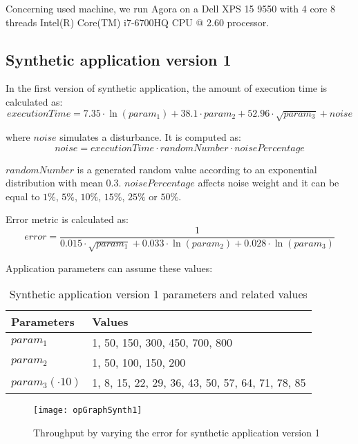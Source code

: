 Concerning used machine, we run Agora on a Dell XPS 15 9550 with 4 core 8 threads Intel(R) Core(TM) i7-6700HQ CPU @ 2.60 processor.


\subsection{Synthetic application version 1}

In the first version of synthetic application, the amount of execution time is calculated as:
\[
executionTime = 7.35 \cdot \ln{(param_1)} + 38.1 \cdot param_2 + 52.96 \cdot \sqrt{param_3} + noise
\]

where $noise$ simulates a disturbance. It is computed as:
\[
noise = executionTime \cdot randomNumber \cdot noisePercentage
\]

$randomNumber$ is a generated random value according to an exponential distribution with mean 0.3. $noisePercentage$ affects noise weight and it can be equal to $1\%$, $5\%$, $10\%$, $15\%$, $25\%$ or $50\%$.

Error metric is calculated as:
\[
error = \dfrac{1}{0.015 \cdot \sqrt{param_1} + 0.033 \cdot \ln{(param_2)} + 0.028 \cdot \ln{(param_3)}}
\]

Application parameters can assume these values:

\begin{table}[H]

    \centering

    \begin{tabular}{ll}
    
        \toprule
        Parameters & Values \\
        \midrule
        $param_1$ & 1, 50, 150, 300, 450, 700, 800 \\
        $param_2$ & 1, 50, 100, 150, 200 \\
        $param_3 (\cdot 10)$ & 1, 8, 15, 22, 29, 36, 43, 50, 57, 64, 71, 78, 85 \\
        \bottomrule 
    
    \end{tabular}

    \caption{Synthetic application version 1 parameters and related values}

\end{table}

\begin{figure}[h]

    \centering
    \texttt{[image: opGraphSynth1]}

    \caption{Throughput by varying the error for synthetic application version 1}

    \label{fig::opListSynth1}
    
\end{figure}

